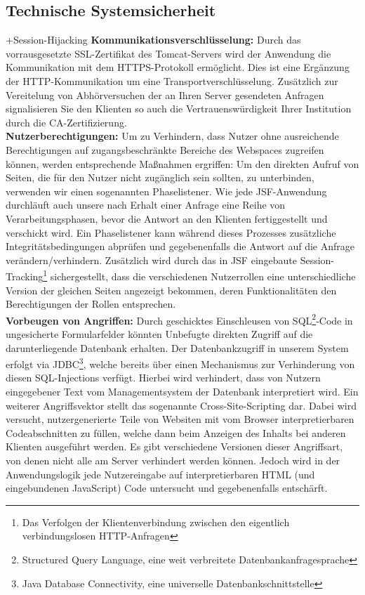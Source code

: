 \documentclass{article}
\begin{document}
\subsection{Technische Systemsicherheit} +Session-Hijacking
\noindent \textbf{Kommunikationsverschlüsselung:} Durch das vorrausgesetzte SSL-Zertifikat des Tomcat-Servers wird der Anwendung die Kommunikation mit dem HTTPS-Protokoll ermöglicht. Dies ist eine Ergänzung der HTTP-Kommunikation um eine Transportverschlüsselung. Zusätzlich zur Vereitelung von Abhörversuchen der an Ihren Server gesendeten Anfragen signalisieren Sie den Klienten so auch die Vertrauenswürdigkeit Ihrer Institution durch die CA-Zertifizierung.\\
\textbf{Nutzerberechtigungen:} Um zu Verhindern, dass Nutzer ohne ausreichende Berechtigungen auf zugangsbeschränkte Bereiche des Webspaces zugreifen können, werden entsprechende Maßnahmen ergriffen: Um den direkten Aufruf von Seiten, die für den Nutzer nicht zugänglich sein sollten, zu unterbinden, verwenden wir einen sogenannten Phaselistener. Wie jede JSF-Anwendung durchläuft auch unsere nach Erhalt einer Anfrage eine Reihe von Verarbeitungsphasen, bevor die Antwort an den Klienten fertiggestellt und verschickt wird. Ein Phaselistener kann während dieses Prozesses zusätzliche Integritätsbedingungen abprüfen und gegebenenfalls die Antwort auf die Anfrage verändern/verhindern. Zusätzlich wird durch das in JSF eingebaute Session-Tracking\footnote{Das Verfolgen der Klientenverbindung zwischen den eigentlich verbindungslosen HTTP-Anfragen} sichergestellt, dass die verschiedenen Nutzerrollen eine unterschiedliche Version der gleichen Seiten angezeigt bekommen, deren Funktionalitäten den Berechtigungen der Rollen entsprechen. \\
\textbf{Vorbeugen von Angriffen:} Durch geschicktes Einschleusen von SQL\footnote{Structured Query Language, eine weit verbreitete Datenbankanfragesprache}-Code in ungesicherte Formularfelder könnten Unbefugte direkten Zugriff auf die darunterliegende Datenbank erhalten. Der Datenbankzugriff in unserem System erfolgt via JDBC\footnote{Java Database Connectivity, eine universelle Datenbankschnittstelle}, welche bereits über einen Mechanismus zur Verhinderung von diesen SQL-Injections verfügt. Hierbei wird verhindert, dass von Nutzern eingegebener Text vom Managementsystem der Datenbank interpretiert wird. Ein weiterer Angriffsvektor stellt das sogenannte Cross-Site-Scripting dar. Dabei wird versucht, nutzergenerierte Teile von Websiten mit vom Browser interpretierbaren Codeabschnitten zu füllen, welche dann beim Anzeigen des Inhalts bei anderen Klienten ausgeführt werden. Es gibt verschiedene Versionen dieser Angriffsart, von denen nicht alle am Server verhindert werden können. Jedoch wird in der Anwendungslogik jede Nutzereingabe auf interpretierbaren HTML (und eingebundenen JavaScript) Code untersucht und gegebenenfalls entschärft.
\end{document}
